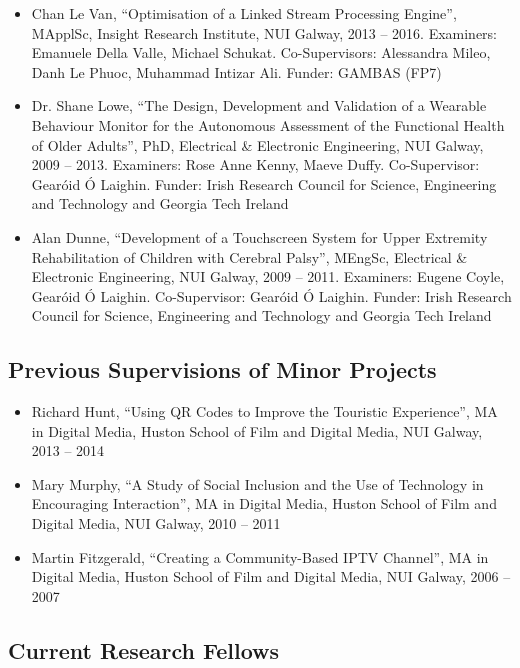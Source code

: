 \documentclass[10pt,a4paper]{res} %
\begin{document}
\begin{resume}
\begin{itemize} \itemsep -2pt
\item Chan Le Van, ``Optimisation of a Linked Stream Processing Engine'', MApplSc, Insight Research Institute, NUI Galway, 2013 -- 2016. Examiners: Emanuele Della Valle, Michael Schukat. Co-Supervisors: Alessandra Mileo, Danh Le Phuoc, Muhammad Intizar Ali. Funder: GAMBAS (FP7)
\item Dr. Shane Lowe, ``The Design, Development and Validation of a Wearable Behaviour Monitor for the Autonomous Assessment of the Functional Health of Older Adults'', PhD, Electrical \& Electronic Engineering, NUI Galway, 2009 -- 2013. Examiners: Rose Anne Kenny, Maeve Duffy. Co-Supervisor: Gear\'{o}id \'{O} Laighin. Funder: Irish Research Council for Science, Engineering and Technology and Georgia Tech Ireland
\item Alan Dunne, ``Development of a Touchscreen System for Upper Extremity Rehabilitation of Children with Cerebral Palsy'', MEngSc, Electrical \& Electronic Engineering, NUI Galway, 2009 -- 2011. Examiners: Eugene Coyle, Gear\'{o}id \'{O} Laighin. Co-Supervisor: Gear\'{o}id \'{O} Laighin. Funder: Irish Research Council for Science, Engineering and Technology and Georgia Tech Ireland
\end{itemize}

\subsection*{Previous Supervisions of Minor Projects}

\begin{itemize} \itemsep -2pt
\item Richard Hunt, ``Using QR Codes to Improve the Touristic Experience'', MA in Digital Media, Huston School of Film and Digital Media, NUI Galway, 2013 -- 2014
\item Mary Murphy, ``A Study of Social Inclusion and the Use of Technology in Encouraging Interaction'', MA in Digital Media, Huston School of Film and Digital Media, NUI Galway, 2010 -- 2011
\item Martin Fitzgerald, ``Creating a Community-Based IPTV Channel'', MA in Digital Media, Huston School of Film and Digital Media, NUI Galway, 2006 -- 2007
\end{itemize}

\subsection*{Current Research Fellows}


\end{resume}
\end{document}
